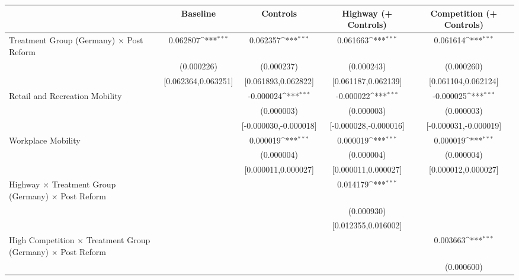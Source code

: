 {
\def\sym#1{\ifmmode^{#1}\else\(^{#1}\)\fi}
\begin{tabular}{l*{4}{c}}
\toprule
                    &\multicolumn{1}{c}{Baseline}&\multicolumn{1}{c}{Controls}&\multicolumn{1}{c}{Highway (+ Controls)}&\multicolumn{1}{c}{Competition (+ Controls)}\\
\midrule
Treatment Group (Germany) $\times$ Post Reform&    0.062807\sym{***}&    0.062357\sym{***}&    0.061663\sym{***}&    0.061614\sym{***}\\
                    &  (0.000226)         &  (0.000237)         &  (0.000243)         &  (0.000260)         \\
                    &[0.062364,0.063251]         &[0.061893,0.062822]         &[0.061187,0.062139]         &[0.061104,0.062124]         \\
Retail and Recreation Mobility&                     &   -0.000024\sym{***}&   -0.000022\sym{***}&   -0.000025\sym{***}\\
                    &                     &  (0.000003)         &  (0.000003)         &  (0.000003)         \\
                    &                     &[-0.000030,-0.000018]         &[-0.000028,-0.000016]         &[-0.000031,-0.000019]         \\
Workplace Mobility  &                     &    0.000019\sym{***}&    0.000019\sym{***}&    0.000019\sym{***}\\
                    &                     &  (0.000004)         &  (0.000004)         &  (0.000004)         \\
                    &                     &[0.000011,0.000027]         &[0.000011,0.000027]         &[0.000012,0.000027]         \\
Highway $\times$ Treatment Group (Germany) $\times$ Post Reform&                     &                     &    0.014179\sym{***}&                     \\
                    &                     &                     &  (0.000930)         &                     \\
                    &                     &                     &[0.012355,0.016002]         &                     \\
High Competition $\times$ Treatment Group (Germany) $\times$ Post Reform&                     &                     &                     &    0.003663\sym{***}\\
                    &                     &                     &                     &  (0.000600)         \\

\end{tabular}}
